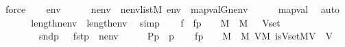 \begin{isabellebody}
\ force\isanewline
\ \ \isamarkupfalse%
\ {\isacartoucheopen}env\ {\isasymin}\ {\isacharunderscore}{\kern0pt}{\isacartoucheclose}\isanewline
\ \ \isamarkupfalse%
\ nenv\ \ {\isachardoublequoteopen}nenv{\isasymin}list{\isacharparenleft}{\kern0pt}M{\isacharparenright}{\kern0pt}{\isachardoublequoteclose}\ {\isachardoublequoteopen}env\ {\isacharequal}{\kern0pt}\ map{\isacharparenleft}{\kern0pt}val{\isacharparenleft}{\kern0pt}G{\isacharparenright}{\kern0pt}{\isacharcomma}{\kern0pt}nenv{\isacharparenright}{\kern0pt}{\isachardoublequoteclose}\isanewline
\ \ \ \ \isamarkupfalse%
\ map{\isacharunderscore}{\kern0pt}val\ \isamarkupfalse%
\ auto\isanewline
\ \ \isamarkupfalse%
\isanewline
\ \ \isamarkupfalse%
\ {\isachardoublequoteopen}length{\isacharparenleft}{\kern0pt}nenv{\isacharparenright}{\kern0pt}\ {\isacharequal}{\kern0pt}\ length{\isacharparenleft}{\kern0pt}env{\isacharparenright}{\kern0pt}{\isachardoublequoteclose}\ \isamarkupfalse%
\ simp\isanewline
\ \ \isamarkupfalse%
\ f\ \ {\isachardoublequoteopen}f{\isacharparenleft}{\kern0pt}{\isasymrho}p{\isacharparenright}{\kern0pt}\ {\isasymequiv}\ {\isasymmu}\ {\isasymalpha}{\isachardot}{\kern0pt}\ {\isasymalpha}{\isasymin}M\ {\isasymand}\ {\isacharparenleft}{\kern0pt}{\isasymexists}{\isasymtau}{\isasymin}M{\isachardot}{\kern0pt}\ {\isasymtau}\ {\isasymin}\ Vset{\isacharparenleft}{\kern0pt}{\isasymalpha}{\isacharparenright}{\kern0pt}\ {\isasymand}\isanewline
\ \ \ \ \ \ \ \ {\isacharparenleft}{\kern0pt}snd{\isacharparenleft}{\kern0pt}{\isasymrho}p{\isacharparenright}{\kern0pt}\ {\isasymtturnstile}\ {\isasymphi}\ {\isacharparenleft}{\kern0pt}{\isacharbrackleft}{\kern0pt}fst{\isacharparenleft}{\kern0pt}{\isasymrho}p{\isacharparenright}{\kern0pt}{\isacharcomma}{\kern0pt}{\isasymtau}{\isacharbrackright}{\kern0pt}\ {\isacharat}{\kern0pt}\ nenv{\isacharparenright}{\kern0pt}{\isacharparenright}{\kern0pt}{\isacharparenright}{\kern0pt}{\isachardoublequoteclose}\ {\isacharparenleft}{\kern0pt}\ {\isachardoublequoteopen}{\isacharunderscore}{\kern0pt}\ {\isasymequiv}\ {\isasymmu}\ {\isasymalpha}{\isachardot}{\kern0pt}\ {\isacharquery}{\kern0pt}P{\isacharparenleft}{\kern0pt}{\isasymrho}p{\isacharcomma}{\kern0pt}{\isasymalpha}{\isacharparenright}{\kern0pt}{\isachardoublequoteclose}{\isacharparenright}{\kern0pt}\ \ {\isasymrho}p\isanewline
\ \ \isamarkupfalse%
\ {\isachardoublequoteopen}f{\isacharparenleft}{\kern0pt}{\isasymrho}p{\isacharparenright}{\kern0pt}\ {\isacharequal}{\kern0pt}\ {\isacharparenleft}{\kern0pt}{\isasymmu}\ {\isasymalpha}{\isachardot}{\kern0pt}\ {\isasymalpha}{\isasymin}M\ {\isasymand}\ {\isacharparenleft}{\kern0pt}{\isasymexists}{\isasymtau}{\isasymin}M{\isachardot}{\kern0pt}\ {\isasymexists}V{\isasymin}M{\isachardot}{\kern0pt}\ is{\isacharunderscore}{\kern0pt}Vset{\isacharparenleft}{\kern0pt}{\isacharhash}{\kern0pt}{\isacharhash}{\kern0pt}M{\isacharcomma}{\kern0pt}{\isasymalpha}{\isacharcomma}{\kern0pt}V{\isacharparenright}{\kern0pt}\ {\isasymand}\ {\isasymtau}{\isasymin}V\ {\isasymand}\isanewline

\end{isabellebody}
